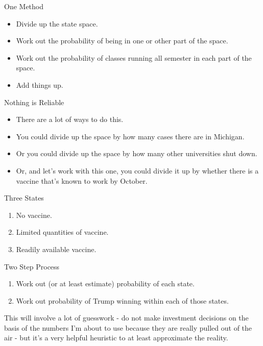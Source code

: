 \documentclass[
  ignorenonframetext,
]{beamer}
\providecommand{\tightlist}{%
  \setlength{\itemsep}{0pt}\setlength{\parskip}{0pt}}
\renewcommand{\,}{\text{, }}
\begin{document}
\begin{frame}{One Method}
\protect\hypertarget{one-method}{}

\begin{itemize}
\tightlist
\item
  Divide up the state space.
\item
  Work out the probability of being in one or other part of the space.
\item
  Work out the probability of classes running all semester in each part
  of the space.
\item
  Add things up.
\end{itemize}

\end{frame}

\begin{frame}{Nothing is Reliable}
\protect\hypertarget{nothing-is-reliable}{}

\begin{itemize}[<+->]
\tightlist
\item
  There are a lot of ways to do this.
\item
  You could divide up the space by how many cases there are in Michigan.
\item
  Or you could divide up the space by how many other universities shut
  down.
\item
  Or, and let's work with this one, you could divide it up by whether
  there is a vaccine that's known to work by October.
\end{itemize}

\end{frame}

\begin{frame}{Three States}
\protect\hypertarget{three-states}{}

\begin{enumerate}
\tightlist
\item
  No vaccine.
\item
  Limited quantities of vaccine.
\item
  Readily available vaccine.
\end{enumerate}

\end{frame}

\begin{frame}{Two Step Process}
\protect\hypertarget{two-step-process}{}

\begin{enumerate}
\tightlist
\item
  Work out (or at least estimate) probability of each state.
\item
  Work out probability of Trump winning within each of those states.
\end{enumerate}

This will involve a lot of guesswork - do not make investment decisions
on the basis of the numbers I'm about to use because they are really
pulled out of the air - but it's a very helpful heuristic to at least
approximate the reality.

\end{frame}
\end{document}
